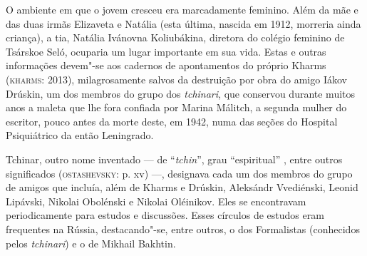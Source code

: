 O ambiente em que o jovem cresceu era marcadamente feminino. Além da mãe
e das duas irmãs Elizaveta e Natália (esta última, nascida em 1912,
morreria ainda criança), a tia, Natália Ivánovna Koliubákina, diretora
do colégio feminino de Tsárskoe Seló, ocuparia um lugar importante em
sua vida. Estas e outras informações devem"-se aos cadernos de
apontamentos do próprio Kharms (\textsc{kharms}: 2013), milagrosamente
salvos da destruição por obra do amigo Iákov Drúskin, um dos membros do
grupo dos \emph{tchinari}, que conservou durante muitos anos a maleta
que lhe fora confiada por Marina Málitch, a segunda mulher do escritor,
pouco antes da morte deste, em 1942, numa das seções do Hospital
Psiquiátrico da então Leningrado.

Tchinar, outro nome inventado --- de ``\emph{tchin}'', grau
``espiritual'' , entre outros significados (\textsc{ostashevsky}: p. xv)
---, designava cada um dos membros do grupo de amigos que incluía, além
de Kharms e Drúskin, Aleksándr Vvediénski, Leonid Lipávski, Nikolai
Obolénski e Nikolai Oléinikov. Eles se encontravam periodicamente para
estudos e discussões. Esses círculos de estudos eram frequentes na
Rússia, destacando"-se, entre outros, o dos Formalistas (conhecidos pelos
\emph{tchinari}) e o de Mikhail Bakhtin.

